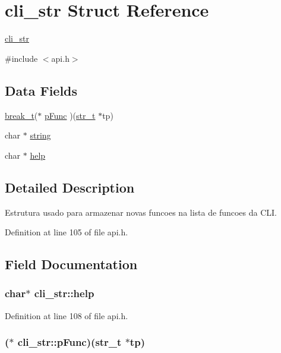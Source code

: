 \hypertarget{structcli__str}{
\section{cli\_\-str Struct Reference}
\label{structcli__str}
}


\hyperlink{structcli__str}{cli\_\-str}  




{\ttfamily \#include $<$api.h$>$}

\subsection*{Data Fields}
\begin{DoxyCompactItemize}
\item 
\hyperlink{api_8h_a330bb39259f2884e12b92081822f4a29}{break\_\-t}($\ast$ \hyperlink{structcli__str_a71d7bdfa56bd0fc2f3a9635dcdaa7b9f}{pFunc} )(\hyperlink{structstr__t}{str\_\-t} $\ast$tp)
\item 
char $\ast$ \hyperlink{structcli__str_a5897bbe3811d29e388c8edd2c0007387}{string}
\item 
char $\ast$ \hyperlink{structcli__str_ae2344da096c4e4916059e2c27e5d9b0f}{help}
\end{DoxyCompactItemize}


\subsection{Detailed Description}
Estrutura usado para armazenar novas funcoes na lista de funcoes da CLI. 

Definition at line 105 of file api.h.



\subsection{Field Documentation}
\hypertarget{structcli__str_ae2344da096c4e4916059e2c27e5d9b0f}{
\subsubsection[{help}]{\setlength{\rightskip}{0pt plus 5cm}char$\ast$ {\bf cli\_\-str::help}}}
\label{structcli__str_ae2344da096c4e4916059e2c27e5d9b0f}


Definition at line 108 of file api.h.

\hypertarget{structcli__str_a71d7bdfa56bd0fc2f3a9635dcdaa7b9f}{
\subsubsection[{pFunc}]{($\ast$ {\bf cli\_\-str::pFunc})({\bf str\_\-t} $\ast$tp)}}
\label{structcli__str_a71d7bdfa56bd0fc2f3a9635dcdaa7b9f}


